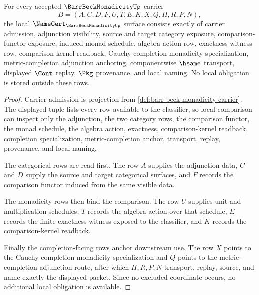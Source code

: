 \begin{theorem}
\label{thm:barr-beck-monadicity-namecert-obligations}
For every accepted $\BarrBeckMonadicityUp$ carrier
$$
B=(A,C,D,F,U,T,E,K,X,Q,H,R,P,N),
$$
the local $\NameCert_{\BarrBeckMonadicityUp}$ surface consists exactly of carrier admission, adjunction visibility, source and target category exposure, comparison-functor exposure, induced monad schedule, algebra-action row, exactness witness row, comparison-kernel readback, Cauchy-completion monadicity specialization, metric-completion adjunction anchoring, componentwise $\hsame$ transport, displayed $\Cont$ replay, $\Pkg$ provenance, and local naming. No local obligation is stored outside these rows.
\end{theorem}
\begin{proof}
Carrier admission is projection from \autoref{def:barr-beck-monadicity-carrier}. The displayed tuple lists every row available to the classifier, so local comparison can inspect only the adjunction, the two category rows, the comparison functor, the monad schedule, the algebra action, exactness, comparison-kernel readback, completion specialization, metric-completion anchor, transport, replay, provenance, and local naming.

The categorical rows are read first. The row $A$ supplies the adjunction data, $C$ and $D$ supply the source and target categorical surfaces, and $F$ records the comparison functor induced from the same visible data.

The monadicity rows then bind the comparison. The row $U$ supplies unit and multiplication schedules, $T$ records the algebra action over that schedule, $E$ records the finite exactness witness exposed to the classifier, and $K$ records the comparison-kernel readback.

Finally the completion-facing rows anchor downstream use. The row $X$ points to the Cauchy-completion monadicity specialization and $Q$ points to the metric-completion adjunction route, after which $H,R,P,N$ transport, replay, source, and name exactly the displayed packet. Since no excluded coordinate occurs, no additional local obligation is available.
\end{proof}


